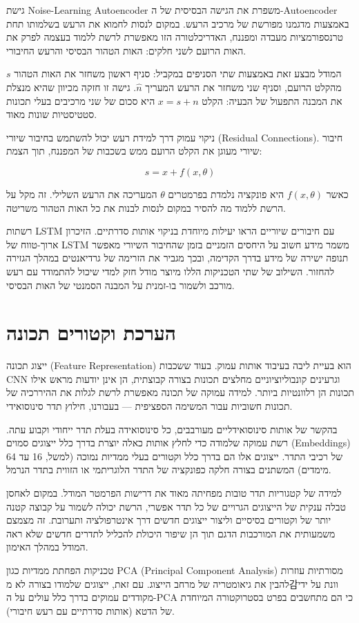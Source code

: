 גישת \textenglish{Noise-Learning Autoencoder} משפרת את הגישה הבסיסית של ה-\textenglish{Autoencoder} באמצעות מדגמנו מפורשת של מרכיב הרעש. במקום לנסות לחמוא את הרעש בשלמותו תחת טרנספורמציות מעבדה ומפננח, האדריכלטורה הזו מאפשרת לרשת ללמוד בעצמה לפרק את האות הרועם לשני חלקים: האות הטהור הבסיסי והרעש החיבורי.

המודל מבצע זאת באמצעות שתי הסניפים במקביל: סניף ראשון משחזר את האות הטהור \(s\) מהקלט הרועם, וסניף שני משחזר את הרעש המעריך \(\hat{n}\). גישה זו חזקה מכיוון שהיא מנצלת את המבנה התפעול של הבעיה: הקלט \(x = s + n\) היא סכום של שני מרכיבים בעלי תכונות סטטיסטיות שונות מאוד.

ניקוי עמוק דרך למידת רעש יכול להשתמש בחיבור שיורי (\textenglish{Residual Connections}). חיבור שיורי מעוגן את הקלט הרועם ממש בשכבות של המפננח, תוך הצמת:

\begin{equation}
\hat{s} = x + f(x, \theta)
\end{equation}

כאשר \(f(x, \theta)\) היא פונקציה נלמדת בפרמטרים \(\theta\) המעריכה את הרעש השלילי. זה מקל על הרשת ללמוד מה להסיר במקום לנסות לבנות את כל האות הטהור משריטה.

רשתות \textenglish{LSTM} עם חיבורים שיוריים הראו יעילות מיוחדת בניקוי אותות סדרתיים. הזיכרון ארוך-טווח של \textenglish{LSTM} משמר מידע חשוב על היחסים הזמניים בזמן שהחיבור השיורי מאפשר תנופה ישירה של מידע בדרך הקדימה, ובכך מגביר את הזרימה של גרדיאנטים במהלך הגזירה להחזור. השילוב של שתי הטכניקות הללו מיוצר מודל חזק למדי שיכול להתמודד עם רעש מורכב ולשמור בו-זמנית על המבנה הסמנטי של האות הבסיסי.

\section{הערכת וקטורים תכונה}

ייצוג תכונה (\textenglish{Feature Representation}) הוא בעיית ליבה בעיבוד אותות עמוק. בעוד ששכבות \textenglish{CNN} וגרעינים קונבוליוציוניים מחלצים תכונות בצורה קבוצתית, הן אינן יודעות מראש אילו תכונות הן רלוונטיות ביותר. למידה עמוקה של תכונה מאפשרת לרשת לגלות את ההיררכיה של תכונות חשוביות עבור המשימה הספציפית --- בעבורנו, חילוץ תדר סינוסואידי.

בהקשר של אותות סינוסואידליים מעורבבים, כל סינוסואידה בעלת תדר ייחודי וקבוע עתה. רשת עמוקה שלמודה כדי לחלץ אותות כאלה יוצרת בדרך כלל ייצוגים סמוים (\textenglish{Embeddings}) של רכיבי התדר. ייצוגים אלו הם בדרך כלל וקטורים בעלי ממדיות נמוכה (למשל, 16 עד 64 מימדים) המשתנים בצורה חלקה כפונקציה של התדר הלוגריתמי או הזווית בתדר הנרמל.

למידה של קטגוריות תדר טובות מפחיתה מאוד את דרישות הפרמטר המודל. במקום לאחסן טבלה ענקית של הייצוגים הגרויים של כל תדר אפשרי, הרשת יכולה לשמור על קבוצה קטנה יותר של וקטורים בסיסיים וליצור ייצוגים חדשים דרך אינטרפולציה ותערובת. זה מצמצם משמעותית את המורכבות הדגם תוך הן שיפור היכולת להכליל לתדרים חדשים שלא ראה המודל במהלך האימון.

טכניקות הפחתת ממדיות כגון \textenglish{PCA} (\textenglish{Principal Component Analysis}) מסורתיות עוזרות להבין את גיאומטריה של מרחב הייצוג. עם זאת, ייצוגים שלמודו בצורה לא מ감וונת על ידי מקודדים עמוקים בדרך כלל עולים על ה-\textenglish{PCA} כי הם מתחשבים בפרט בסטרוקטורה המיוחדת של הדטא (אותות סדרתיים עם רעש חיבורי).